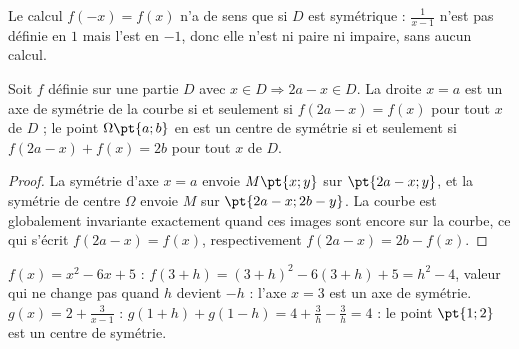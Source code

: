 \begin{pitfall}
Le calcul $f(-x)=f(x)$ n'a de sens que si $D$ est symétrique : $\frac{1}{x-1}$ n'est pas définie en $1$ mais l'est en $-1$, donc elle n'est ni paire ni impaire, sans aucun calcul.
\end{pitfall}
\begin{theorem}
Soit $f$ définie sur une partie $D$ avec $x\in D\Rightarrow 2a-x\in D$. La droite $x=a$ est un axe de symétrie de la courbe si et seulement si $f(2a-x)=f(x)$ pour tout $x$ de $D$ ; le point $\Omega\pt{a;b}$ en est un centre de symétrie si et seulement si $f(2a-x)+f(x)=2b$ pour tout $x$ de $D$.
\end{theorem}
\begin{proof}
La symétrie d'axe $x=a$ envoie $M\pt{x;y}$ sur $\pt{2a-x;y}$, et la symétrie de centre $\Omega$ envoie $M$ sur $\pt{2a-x;2b-y}$. La courbe est globalement invariante exactement quand ces images sont encore sur la courbe, ce qui s'écrit $f(2a-x)=f(x)$, respectivement $f(2a-x)=2b-f(x)$.
\end{proof}
\begin{example}
$f(x)=x^2-6x+5$ : $f(3+h)=(3+h)^2-6(3+h)+5=h^2-4$, valeur qui ne change pas quand $h$ devient $-h$ : l'axe $x=3$ est un axe de symétrie. $g(x)=2+\frac{3}{x-1}$ : $g(1+h)+g(1-h)=4+\frac3h-\frac3h=4$ : le point $\pt{1;2}$ est un centre de symétrie.
\end{example}

